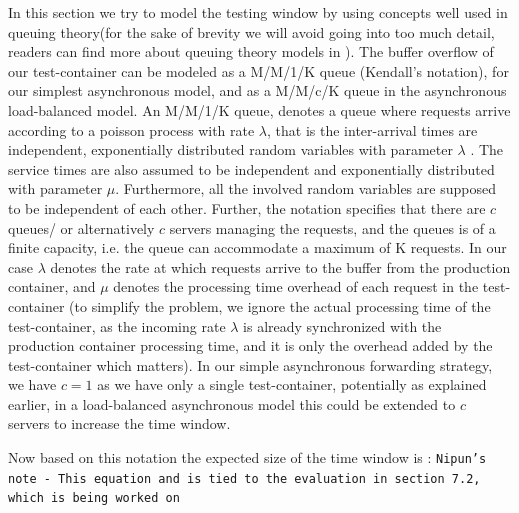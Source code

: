 In this section we try to model the testing window by using concepts well used in queuing theory(for the sake of brevity we will avoid going into too much detail, readers can find more about queuing theory models in \cite{queueWiki}).
The buffer overflow of our test-container can be modeled as a M/M/1/K queue (Kendall's notation\cite{kendall}), for our simplest asynchronous model, and as a M/M/c/K queue in the asynchronous load-balanced model.
An M/M/1/K queue, denotes a queue where requests arrive according to a poisson process with rate $\lambda$, that is the inter-arrival times are independent, exponentially distributed random variables with parameter $\lambda$ . 
The service times are also assumed to be independent and exponentially distributed with parameter $\mu$. Furthermore, all the involved random variables are supposed to be independent of each other. 
Further, the notation specifies that there are $c$ queues/ or alternatively $c$ servers managing the requests, and the queues is of a finite capacity, i.e. the queue can accommodate a maximum of K requests.
In our case $\lambda$ denotes the rate at which requests arrive to the buffer from the production container, and $\mu$ denotes the processing time overhead of each request in the test-container (to simplify the problem, we ignore the actual processing time of the test-container, as the incoming rate $\lambda$ is already synchronized with the production container processing time, and it is only the overhead added by the test-container which matters). 
In our simple asynchronous forwarding strategy, we have $c=1$ as we have only a single test-container, potentially as explained earlier, in a load-balanced asynchronous model this could be extended to $c$ servers to increase the time window.

Now based on this notation the expected size of the time window is :
\texttt{Nipun's note - This equation and is tied to the evaluation in section 7.2, which is being worked on}




